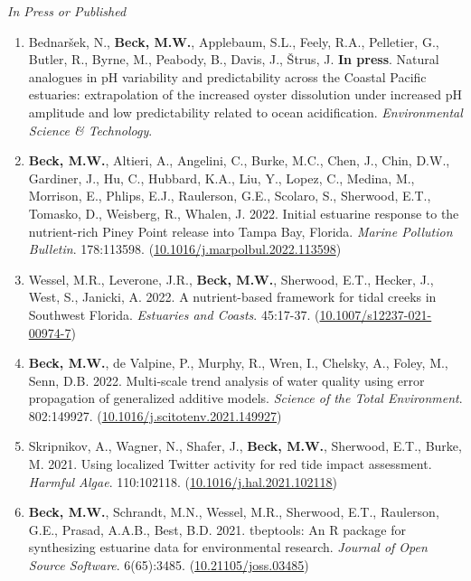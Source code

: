 \documentclass[letterpaper,12pt]{article}
\newcommand{\subsectitle}[1]{\vspace{\baselineskip} \centerline{\normalsize{\textit{#1}}}}
\begin{document}
\subsectitle{In Press or Published}

\begin{enumerate}

\item Bednar\v{s}ek, N., \textbf{Beck, M.W.}, Applebaum, S.L., Feely, R.A., Pelletier, G., Butler, R., Byrne, M., Peabody, B., Davis, J., \v{S}trus, J. \textbf{In press}. Natural analogues in p{H} variability and predictability across the {C}oastal {P}acific estuaries: extrapolation of the increased oyster dissolution under increased p{H} amplitude and low predictability related to ocean acidification. \textit{Environmental Science \& Technology}.

\item \textbf{Beck, M.W.}, Altieri, A., Angelini, C., Burke, M.C., Chen, J., Chin, D.W., Gardiner, J., Hu, C., Hubbard, K.A., Liu, Y., Lopez, C., Medina, M., Morrison, E., Phlips, E.J., Raulerson, G.E., Scolaro, S., Sherwood, E.T., Tomasko, D., Weisberg, R., Whalen, J. 2022. Initial estuarine response to the nutrient-rich Piney Point release into Tampa Bay, Florida. \textit{Marine Pollution Bulletin}. 178:113598. ({\footnotesize\href{https://doi.org/10.1016/j.marpolbul.2022.113598}{10.1016/j.marpolbul.2022.113598}})

\item Wessel, M.R., Leverone, J.R., \textbf{Beck, M.W.}, Sherwood, E.T., Hecker, J., West, S., Janicki, A. 2022. A nutrient-based framework for tidal creeks in Southwest Florida. \textit{Estuaries and Coasts}. 45:17-37. ({\footnotesize\href{https://doi.org/10.1007/s12237-021-00974-7}{10.1007/s12237-021-00974-7}})

\item \textbf{Beck, M.W.}, de Valpine, P., Murphy, R., Wren, I., Chelsky, A., Foley, M., Senn, D.B. 2022. Multi-scale trend analysis of water quality using error propagation of generalized additive models. \textit{Science of the Total Environment}. 802:149927. ({\footnotesize\href{https://doi.org/10.1016/j.scitotenv.2021.149927}{10.1016/j.scitotenv.2021.149927}})

\item Skripnikov, A., Wagner, N., Shafer, J., \textbf{Beck, M.W.}, Sherwood, E.T., Burke, M. 2021. Using localized Twitter activity for red tide impact assessment. \textit{Harmful Algae}. 110:102118. ({\footnotesize\href{https://doi.org/10.1016/j.hal.2021.102118}{10.1016/j.hal.2021.102118}})

\item \textbf{Beck, M.W.}, Schrandt, M.N., Wessel, M.R., Sherwood, E.T., Raulerson, G.E., Prasad, A.A.B., Best, B.D. 2021. tbeptools: An R package for synthesizing estuarine data for environmental research. \textit{Journal of Open Source Software}. 6(65):3485. ({\footnotesize\href{https://doi.org/10.21105/joss.03485}{10.21105/joss.03485}})


\end{enumerate}
\end{document}
